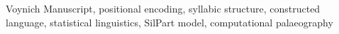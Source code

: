 Voynich Manuscript, positional encoding, syllabic structure, constructed language, statistical linguistics, SilPart model, computational palaeography

